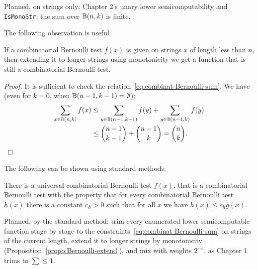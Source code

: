\begin{formalization}
Planned, on strings only: Chapter 2's unary lower semicomputability and \texttt{IsMonoStr}; the
sum over $\mathbb{B}(n,k)$ is finite.
\end{formalization}

The following observation is useful.

 \begin{proposition}\label{propo:Bernoulli-extend}
If a combinatorial Bernoulli test \( f(x) \) is given on strings \( x \)
of length less than \( n \), then extending it to longer strings using 
monotonicity we get a function that is still a combinatorial Bernoulli test.
 \end{proposition}
 \begin{proof}
It is sufficient to check the relation~\eqref{eq:combinat-Bernoulli-sum}.
We have (even for \( k=0 \), when \( \mathbb{B}(n-1,k-1)=\emptyset \)):
 \begin{align*}
  \sum_{x\in\mathbb{B}(n,k)} f(x) &\le
  \sum_{y\in\mathbb{B}(n-1,k-1)}f(y)+\sum_{y\in\mathbb{B}(n-1,k)} f(y) 
\\ &\le \binom{n-1}{k-1} + \binom{n-1}{k} = \binom{n}{k}.
 \end{align*}
 \end{proof}

The following can be shown using standard methods:
  
 \begin{proposition}
  \label{prop:g4.2.13}
There is a universal combinatorial Bernoulli test \( f(x) \), that is a combinatorial
Bernoulli test with the property that for every
combinatorial Bernoulli test \( h(x) \) there is a constant \( c_{h}>0 \) such that for
all \( x \) we have \( h(x) \le c_{h} g(x) \).
 \end{proposition}

\begin{formalization}
Planned, by the standard method: trim every enumerated lower semicomputable function stage by
stage to the constraints~\eqref{eq:combinat-Bernoulli-sum} on strings of the current length, extend it to longer strings by
monotonicity (Proposition~\ref{propo:Bernoulli-extend}), and mix with weights $2^{-e}$, as
Chapter 1 trims to $\sum\le 1$.
\end{formalization}

